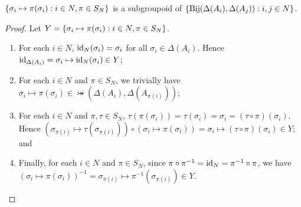 \begin{proposition} \label{prop:firstgroupoidprop}
	$\left\{\sigma_i \mapsto \pi(\sigma_i): i \in N, \pi \in S_N\right\}$ is a subgroupoid of $\left\{\operatorname*{Bij}(\Delta(A_i), \Delta(A_j)): i, j \in N\right\}$.
	
	\begin{proof}		
		Let $Y = \left\{\sigma_i \mapsto \pi(\sigma_i): i \in N, \pi \in S_N\right\}$.
		
		\begin{enumerate}
			\item For each $i \in N$, $\text{id}_N(\sigma_i) = \sigma_i$ for all $\sigma_i \in \Delta(A_i)$. Hence $\text{id}_{\Delta(A_i)} = \sigma_i \mapsto \text{id}_N(\sigma_i) \in Y$;
			\item For each $i \in N$ and $\pi \in S_N$, we trivially have $\sigma_i \mapsto \pi(\sigma_i) \in \bij(\Delta(A_i), \Delta(A_{\pi(i)}))$;
			\item For each $i \in N$ and $\pi, \tau \in S_N$, $\tau(\pi(\sigma_i)) = \tau(\sigma_i) = \sigma_i = (\tau \circ \pi)(\sigma_i)$. Hence $(\sigma_{\pi(i)} \mapsto \tau(\sigma_{\pi(i)})) \circ (\sigma_i \mapsto \pi(\sigma_i)) = \sigma_i \mapsto (\tau \circ \pi)(\sigma_i) \in Y$; and
			\item Finally, for each $i \in N$ and $\pi \in S_N$, since $\pi \circ \pi^{-1} = \text{id}_N = \pi^{-1} \circ \pi$, we have $(\sigma_i \mapsto \pi(\sigma_i))^{-1} = \sigma_{\pi(i)} \mapsto \pi^{-1}(\sigma_{\pi(i)}) \in Y$.
		\end{enumerate} \vspace{-0.8cm}
	\end{proof}
\end{proposition}

